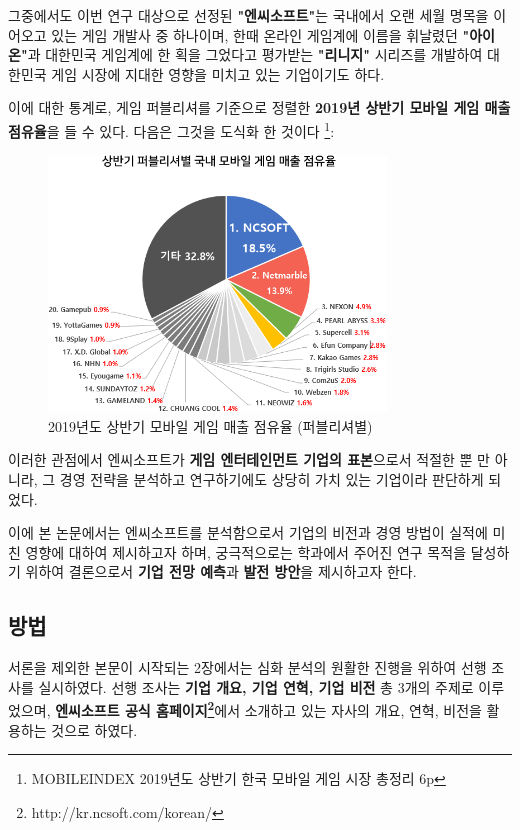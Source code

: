 \documentclass[11pt]{oblivoir}
\begin{document}
			그중에서도 이번 연구 대상으로 선정된 \textbf{"엔씨소프트"}는 국내에서 오랜 세월 명목을 이어오고 있는 게임 개발사 중 하나이며, 한때 온라인 게임계에 이름을 휘날렸던 \textbf{"아이온"}과 대한민국 게임계에 한 획을 그었다고 평가받는 \textbf{"리니지"} 시리즈를 개발하여 대한민국 게임 시장에 지대한 영향을 미치고 있는 기업이기도 하다. 
			
			이에 대한 통계로, 게임 퍼블리셔를 기준으로 정렬한 \textbf{2019년 상반기 모바일 게임 매출 점유율}을 들 수 있다. 다음은 그것을 도식화 한 것이다
			\footnote{MOBILEINDEX 2019년도 상반기 한국 모바일 게임 시장 총정리 6p}:
			
			
			\begin{figure}[htbp]
				\centering
				\includegraphics[width=0.8\textwidth]{MobileMaechul.png}
				\caption{2019년도 상반기 모바일 게임 매출 점유율 (퍼블리셔별)}
			\end{figure}
			
			이러한 관점에서 엔씨소프트가 \textbf{게임 엔터테인먼트 기업의 표본}으로서 적절한 뿐 만 아니라, 그 경영 전략을 분석하고 연구하기에도 상당히 가치 있는 기업이라 판단하게 되었다.
			
			이에 본 논문에서는 엔씨소프트를 분석함으로서 기업의 비전과 경영 방법이 실적에 미친 영향에 대하여 제시하고자 하며, 궁극적으로는 학과에서 주어진 연구 목적을 달성하기 위하여 결론으로서 \textbf{기업 전망 예측}과 \textbf{발전 방안}을 제시하고자 한다.
					
		\subsection{방법}
			서론을 제외한 본문이 시작되는 2장에서는 심화 분석의 원활한 진행을 위하여 선행 조사를 실시하였다. 선행 조사는 \textbf{기업 개요, 기업 연혁, 기업 비전} 총 3개의 주제로 이루었으며, \textbf{엔씨소프트 공식 홈페이지\footnote{http://kr.ncsoft.com/korean/}}에서 소개하고 있는 자사의 개요, 
			연혁, 비전을 활용하는 것으로 하였다. 
			
\end{document}
